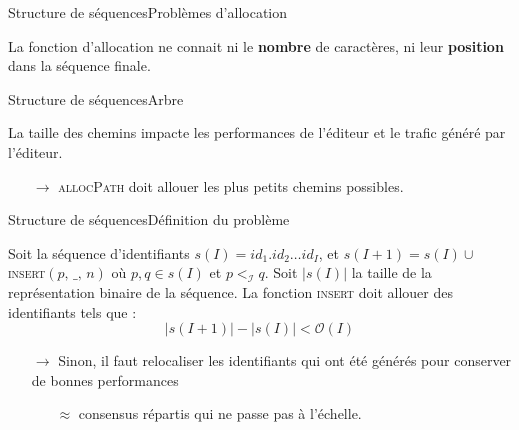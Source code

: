 \begin{frame}{Structure de séquences}{Problèmes d'allocation}

  La fonction d'allocation ne connait ni le \textbf{nombre} de caractères, ni
  leur \textbf{position} dans la séquence finale.
  
  \vspace{0.5cm}

  \begin{center}
    
  \end{center}

\end{frame}


\begin{frame}{Structure de séquences}{Arbre}
  
  \begin{center}
    
  \end{center}
  
  \vspace{0.5cm}
  
  La taille des chemins impacte les performances de l'éditeur et le trafic
  généré par l'éditeur.
  \begin{itemize}
  \item [$\rightarrow$] \textsc{allocPath} doit allouer les plus petits chemins
    possibles.
  \end{itemize}

\end{frame}


\begin{frame}{Structure de séquences}{Définition du problème}

  \begin{problem}
    Soit la séquence d'identifiants $s(I)= id_1.id_2\ldots id_I$, et
    $s(I+1) = s(I) \cup $\textsc{insert}$(p,\, \_,\, n)$ où $p,q \in s(I)$ et
    $p<_\mathcal{I}q$. Soit $|s(I)|$ la taille de la représentation binaire de la
    séquence. La fonction \textsc{insert} doit allouer des identifiants tels que :
    \begin{equation}
      |s(I+1)| - |s(I)| < \mathcal{O}(I)
    \end{equation}
  \end{problem}
  
  \vspace{0.5cm}

  \begin{itemize}
  \item [$\rightarrow$] Sinon, il faut relocaliser les identifiants qui ont été
    générés pour conserver de bonnes performances
    \begin{itemize}
    \item [$\approx$] consensus répartis qui ne passe pas à l'échelle.
    \end{itemize}
  \end{itemize}

\end{frame}


